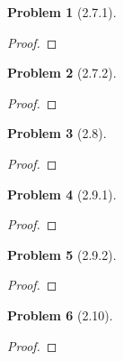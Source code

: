 \documentclass[10pt]{article}
\newcommand{\sk}{\vskip 10mm}
\theoremstyle{plain}
\newtheorem{problem}{Problem}
\theoremstyle{remark}
\begin{document}
\begin{problem}[2.7.1]
  
\end{problem}

\begin{proof}
  
\end{proof}

\sk

\begin{problem}[2.7.2]
  
\end{problem}

\begin{proof}
  
\end{proof}

\sk

\begin{problem}[2.8]
  
\end{problem}

\begin{proof}
  
\end{proof}

\sk

\begin{problem}[2.9.1]
  
\end{problem}

\begin{proof}
  
\end{proof}

\sk

\begin{problem}[2.9.2]
  
\end{problem}

\begin{proof}
  
\end{proof}

\sk

\begin{problem}[2.10]
  
\end{problem}

\begin{proof}
  
\end{proof}

\end{document}
